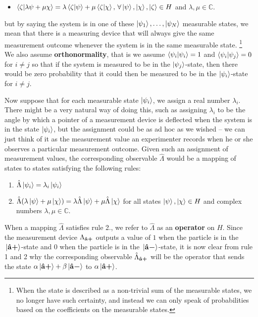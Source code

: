\documentclass[letter, 12pt]{turabian-thesis}
\theoremstyle{hypothesis}
\newcommand{\uvb}[1]{\vb{\hat{{#1}}}}
\newcommand{\uvbp}[1]{\uvb{#1}\bm{+}}
\newcommand{\uvbm}[1]{\uvb{#1}\bm{-}}
\let\origfootnote\footnote %
\renewcommand{\footnote}[1]{%
\noindent %
\origfootnote{#1}}
\begin{document}
{\begin{itemize}[topsep=0pt]
\item $\ip{\zeta}{\lambda\psi+\mu\chi}=\lambda\ip{\zeta}{\psi}+\mu\ip{\zeta}{\chi},\,\forall \ket{\psi},\ket{\chi},\ket{\zeta}\in H$ and  $\lambda,\mu\in\mathbb{C}$.
\end{itemize}} but by saying the system is in one of these $\ket{\psi_1},\ldots,\ket{\psi_N}$ measurable states, we mean that there is a measuring device that will always give the same measurement outcome whenever the system is in the same measurable state.\footnote{When the state is described as a non-trivial sum of the measurable states, we no longer have such certainty, and instead we can only speak of probabilities based on the coefficients on the measurable states.} We also assume \textbf{orthonormality}, that is we assume $\ip{\psi_i}{\psi_i}=1$ and $\ip{\psi_i}{\psi_j}=0$ for $i\neq j$ so that if the system is measured to be in the $\ket{\psi_j}$-state, then there would be zero probability that it could then be measured to be in the $\ket{\psi_i}$-state for $i\neq j$.  

Now suppose that for each measurable state $\ket{\psi_i}$, we assign a real number $\lambda_i$.  There might be a very natural way of doing this, such as assigning  $\lambda_i$ to be the angle by which a pointer of a measurement device is deflected when the system is in the state $\ket{\psi_i}$, but the assignment could be as ad hoc as we wished – we can just think of it as the measurement value an experimenter records when he or she observes a particular measurement outcome. Given such an assignment of measurement values, the corresponding observable $\hat{\Lambda}$ would be a mapping of states to states satisfying the following rules:
\begin{enumerate}[noitemsep, nosep, topsep=0pt]
\item $\hat{\Lambda}\ket{\psi_i}=\lambda_i\ket{\psi_i}$
\item $\hat{\Lambda}(\lambda\ket{\psi}+\mu\ket{\chi})=\lambda\hat{\Lambda}\ket{\psi}+\mu\hat{\Lambda}\ket{\chi}$  for all states $\ket{\psi},\ket{\chi}\in H$ and complex numbers $\lambda,\mu\in\mathbb{C}$.
\end{enumerate}
When a mapping $\hat{\Lambda}$ satisfies rule 2., we refer to $\hat{\Lambda}$ as an \textbf{operator} on $H$. Since the measurement device $\Lambda_{\uvbp{a}}$ outputs a value of $1$ when the particle is in the $\ket*{\uvbp{a}}$-state and $0$ when the particle is in the $\ket*{\uvbm{a}}$-state, it is now clear from rule 1 and 2 why the corresponding observable $\hat{\Lambda}_{\uvbp{a}}$ will be the operator that sends the state $\alpha\ket*{\uvbp{a}}+\beta\ket*{\uvbm{a}}$ to $\alpha\ket*{\uvbp{a}}$.
\end{document}
